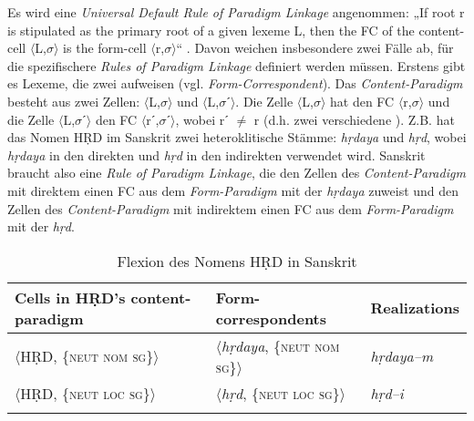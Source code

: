 Es wird eine \textit{Universal Default Rule of Paradigm Linkage} angenommen: „If root r is stipulated as the primary root of a given lexeme L, then the FC of the content-cell $\langle$L,$\sigma$$\rangle$ is the form-cell $\langle$r,$\sigma$$\rangle$“ \citep[120]{AckermanStump2004}. Davon weichen insbesondere zwei Fälle ab, für die spezifischere \textit{Rules of Paradigm Linkage} definiert werden müssen. Erstens gibt es Lexeme, die zwei  aufweisen (vgl.  \textit{Form-Correspondent}). Das \textit{Content-Paradigm} besteht aus zwei Zellen: $\langle$L,$\sigma$$\rangle$ und $\langle$L,$\sigma$ˊ$\rangle$. Die Zelle $\langle$L,$\sigma$$\rangle$ hat den FC $\langle$r,$\sigma$$\rangle$ und die Zelle $\langle$L,$\sigma$ˊ$\rangle$ den FC $\langle$rˊ,$\sigma$ˊ$\rangle$, wobei rˊ ${\neq}$ r (d.h. zwei verschiedene ). Z.B. hat das Nomen HṚD im Sanskrit zwei heteroklitische Stämme: \textit{hṛdaya} und \textit{hṛd}, wobei \textit{hṛdaya} in den direkten und \textit{hṛd} in den indirekten  verwendet wird. Sanskrit braucht also eine \textit{Rule of Paradigm Linkage}, die den Zellen des \textit{Content-Paradigm} mit direktem  einen FC aus dem \textit{Form-Paradigm} mit der  \textit{hṛdaya} zuweist und den Zellen des \textit{Content-Paradigm} mit indirektem  einen FC aus dem \textit{Form-Paradigm} mit der  \textit{hṛd}.


\begin{table}
\caption{Flexion des Nomens HṚD in Sanskrit \citep[121]{AckermanStump2004}}\label{table4.5}
\begin{tabular}{lll}
\lsptoprule
{Cells in HṚD’s content-paradigm} & {Form-correspondents} & {Realizations}\\\midrule
$\langle$HṚD, \{\textsc{neut nom sg}\}$\rangle$ & $\langle$\textit{hṛdaya}, \{\textsc{neut nom sg}\}$\rangle$ & \textit{hṛdaya–m}\\
$\langle$HṚD, \{\textsc{neut loc sg}\}$\rangle$ & $\langle$\textit{hṛd},    \{\textsc{neut loc sg}\}$\rangle$ &    \textit{hṛd–i}\\
\lspbottomrule
\end{tabular}
\end{table}


